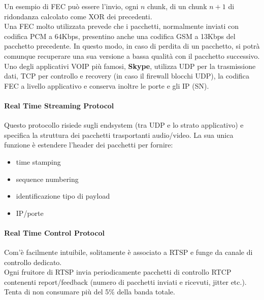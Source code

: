 Un esempio di FEC può essere l'invio, ogni $ n $ chunk, di un chunk $ n + 1 $ di ridondanza calcolato come XOR dei precedenti.\\
Una FEC molto utilizzata prevede che i pacchetti, normalmente inviati con codifica PCM a 64Kbps, presentino anche una codifica GSM a 13Kbps del pacchetto precedente. In questo modo, in caso di perdita di un pacchetto, si potrà comunque recuperare una sua versione a bassa qualità con il pacchetto successivo.\\
Uno degli applicativi VOIP più famosi, \textbf{Skype}, utilizza UDP per la trasmissione dati, TCP per controllo e recovery (in caso il firewall blocchi UDP), la codifica FEC a livello applicativo e conserva inoltre le porte e gli IP (SN).

\paragraph{Real Time Streaming Protocol}
Questo protocollo risiede sugli endsystem (tra UDP e lo strato applicativo) e specifica la struttura dei pacchetti trasportanti audio/video. La sua unica funzione è estendere l'header dei pacchetti per fornire:
\begin{itemize}
    \item time stamping
    \item sequence numbering
    \item identificazione tipo di payload
    \item IP/porte
\end{itemize}

\paragraph{Real Time Control Protocol}
Com'è facilmente intuibile, solitamente è associato a RTSP e funge da canale di controllo dedicato.\\
Ogni fruitore di RTSP invia periodicamente pacchetti di controllo RTCP contenenti report/feedback (numero di pacchetti inviati e ricevuti, jitter etc.). Tenta di non consumare più del 5\% della banda totale.
